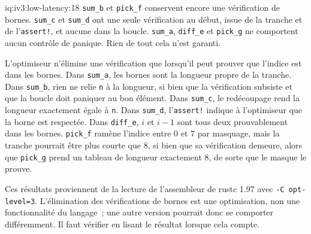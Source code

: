 \begin{solution}{iq:iv3:low-latency:18}
\texttt{sum\_b} et \texttt{pick\_f} conservent encore une vérification de bornes. \texttt{sum\_c} et \texttt{sum\_d} ont une seule vérification au début, issue de la tranche et de l'\texttt{assert!}, et aucune dans la boucle. \texttt{sum\_a}, \texttt{diff\_e} et \texttt{pick\_g} ne comportent aucun contrôle de panique. Rien de tout cela n'est garanti.

L'optimiseur n'élimine une vérification que lorsqu'il peut prouver que l'indice est dans les bornes. Dans \texttt{sum\_a}, les bornes sont la longueur propre de la tranche. Dans \texttt{sum\_b}, rien ne relie \texttt{n} à la longueur, si bien que la vérification subsiste et que la boucle doit paniquer au bon élément. Dans \texttt{sum\_c}, le redécoupage rend la longueur exactement égale à \texttt{n}. Dans \texttt{sum\_d}, l'\texttt{assert!} indique à l'optimiseur que la borne est respectée. Dans \texttt{diff\_e}, $i$ et $i - 1$ sont tous deux prouvablement dans les bornes. \texttt{pick\_f} ramène l'indice entre 0 et 7 par masquage, mais la tranche pourrait être plus courte que 8, si bien que sa vérification demeure, alors que \texttt{pick\_g} prend un tableau de longueur exactement 8, de sorte que le masque le prouve.

Ces résultats proviennent de la lecture de l'assembleur de rustc 1.97 avec \texttt{-C opt-level=3}. L'élimination des vérifications de bornes est une optimisation, non une fonctionnalité du langage~; une autre version pourrait donc se comporter différemment. Il faut vérifier en lisant le résultat lorsque cela compte.

\end{solution}

